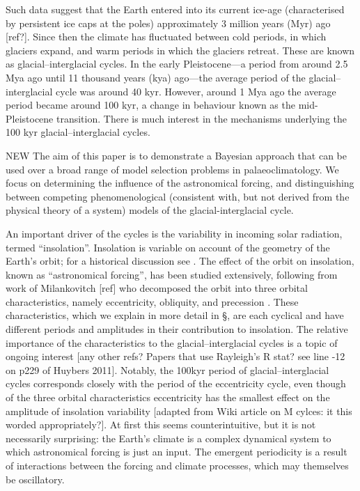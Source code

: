 \documentclass[a4paper,12pt]{article}
\begin{document}
Such data suggest that the Earth entered into its current ice-age (characterised by
persistent ice caps at the poles) approximately 3 million years (Myr) ago [ref?].  Since
then the climate has fluctuated between cold periods, in which glaciers expand, and warm
periods in which the glaciers retreat.  These are known as glacial--interglacial cycles.  In
the early Pleistocene---a period from around 2.5 Mya ago until 11 thousand years (kya)
ago---the average period of the glacial--interglacial cycle was around 40 kyr.  However,
around 1 Mya ago the average period became around 100 kyr, a change in behaviour known as
the mid-Pleistocene transition. There is much interest in the mechanisms underlying the
100 kyr glacial--interglacial cycles.

NEW The aim of this paper is to demonstrate a Bayesian approach that can be used over a
broad range of model selection problems in palaeoclimatology.  We focus on determining
the influence of the astronomical forcing, and distinguishing between competing
phenomenological (consistent with, but not derived from the physical theory of a system)
models of the glacial-interglacial cycle.


An important driver of the cycles is the variability in incoming solar
radiation, termed ``insolation''.  Insolation is variable on account of the geometry of the
Earth's orbit; for a historical discussion see \cite{Berger2004}.  The effect of the orbit
on insolation, known as ``astronomical forcing'', has been studied extensively, following
from work of Milankovitch [ref] who decomposed the orbit into three orbital characteristics,
namely eccentricity, obliquity, and precession \cite{Hays1976}.  These characteristics,
which we explain in more detail in \S, are each cyclical and have different periods and
amplitudes in their contribution to insolation.  The relative importance of the
characteristics to the glacial--interglacial cycles is a topic of ongoing interest
\cite{Huybers2005,Lisiecki2010,Huybers2011} [any other refs?  Papers that use Rayleigh's R
stat? see line -12 on p229 of Huybers 2011].  Notably, the 100kyr period of
glacial--interglacial cycles corresponds closely with the period of the eccentricity cycle,
even though of the three orbital characteristics eccentricity has the smallest effect on the
amplitude of insolation variability [adapted from Wiki article on M cylces: it this worded
appropriately?].  At first this seems counterintuitive, but it is not necessarily
surprising: the Earth's climate is a complex dynamical system to which astronomical forcing
is just an input.  The emergent periodicity is a result of interactions between the forcing
and climate processes, which may themselves be oscillatory.
\end{document}
